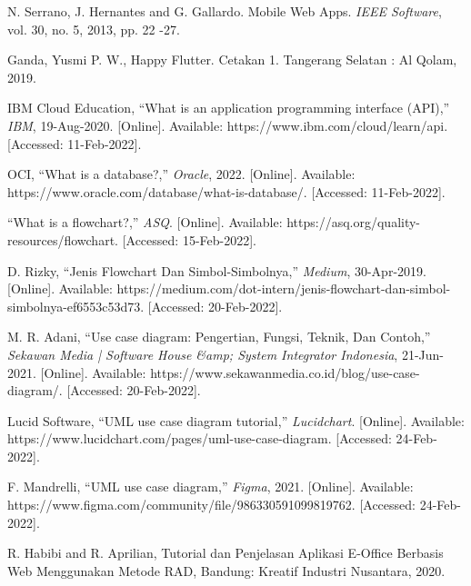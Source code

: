 \begin{thebibliography}{7}
N. Serrano, J. Hernantes and G. Gallardo. Mobile Web Apps. \emph{IEEE Software}, vol. 30, no. 5, 2013, pp. 22 -27.

Ganda, Yusmi P. W., Happy Flutter. Cetakan 1. Tangerang Selatan : Al Qolam, 2019.

IBM Cloud Education, “What is an application programming interface (API),” \emph{IBM}, 19-Aug-2020. [Online]. Available: https://www.ibm.com/cloud/learn/api. [Accessed: 11-Feb-2022]. 

OCI, “What is a database?,” \emph{Oracle}, 2022. [Online]. Available: https://www.oracle.com/database/what-is-database/. [Accessed: 11-Feb-2022]. 

“What is a flowchart?,” \emph{ASQ}. [Online]. Available: https://asq.org/quality-resources/flowchart. [Accessed: 15-Feb-2022]. 

D. Rizky, “Jenis Flowchart Dan Simbol-Simbolnya,” \emph{Medium}, 30-Apr-2019. [Online]. Available: https://medium.com/dot-intern/jenis-flowchart-dan-simbol-simbolnya-ef6553c53d73. [Accessed: 20-Feb-2022]. 

M. R. Adani, “Use case diagram: Pengertian, Fungsi, Teknik, Dan Contoh,” \emph{Sekawan Media | Software House \&amp; System Integrator Indonesia}, 21-Jun-2021. [Online]. Available: https://www.sekawanmedia.co.id/blog/use-case-diagram/. [Accessed: 20-Feb-2022]. 

Lucid Software, “UML use case diagram tutorial,” \emph{Lucidchart}. [Online]. Available: https://www.lucidchart.com/pages/uml-use-case-diagram. [Accessed: 24-Feb-2022]. 

F. Mandrelli, “UML use case diagram,” \emph{Figma}, 2021. [Online]. Available: https://www.figma.com/community/file/986330591099819762. [Accessed: 24-Feb-2022]. 

R.   Habibi   and   R.   Aprilian,   Tutorial   dan Penjelasan  Aplikasi  E-Office  Berbasis  Web Menggunakan Metode RAD, Bandung: Kreatif Industri Nusantara, 2020. 


\end{thebibliography}
